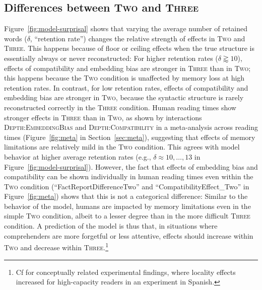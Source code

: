 \subsection{Differences between \textsc{Two} and \textsc{Three}}
Figure~\ref{fig:model-surprisal} shows that varying the average number of retained words ($\delta$, ``retention rate'') changes the relative strength of effects in \textsc{Two} and \textsc{Three}.
This happens because of floor or ceiling effects when the true structure is essentially always or never reconstructed:
For higher retention rates ($\delta \gtrapprox 10$), effects of compatibility and embedding bias are stronger in \textsc{Three} than in \textsc{Two}; this happens because the \textsc{Two} condition is unaffected by memory loss at high retention rates. 
In contrast, for low retention rates, effects of compatibility and embedding bias are stronger in \textsc{Two}, because the syntactic structure is rarely reconstructed correctly in the \textsc{Three} condition. 
Human reading times show stronger effects in \textsc{Three} than in \textsc{Two}, as shown by interactions \textsc{Depth}:\textsc{EmbeddingBias} and \textsc{Depth}:\textsc{Compatibility} in a meta-analysis across reading times (Figure~\ref{fig:meta} in Section~\ref{sec:meta}), suggesting that effects of memory limitations are relatively mild in the \textsc{Two} condition.
This agrees with model behavior at higher average retention rates (e.g., $\delta \approx 10, \dots, 13$ in Figure~\ref{fig:model-surprisal}).
However, the fact that effects of embedding bias and compatibility can be shown individually in human reading times even within the  \textsc{Two} condition  (``FactReportDifferenceTwo'' and ``CompatibilityEffect\_Two'' in Figure~\ref{fig:meta}) shows that this is not a categorical difference: Similar to the behavior of the model, humans are impacted by memory limitations even in the simple \textsc{Two} condition, albeit to a lesser degree than in the more difficult \textsc{Three} condition.
A prediction of the model is thus that, in situations where comprehenders are more forgetful or less attentive, effects should increase within \textsc{Two} and decrease within \textsc{Three}.\footnote{Cf \citet{Nicenboim2016WhenHR} for conceptually related experimental findings, where locality effects increased for high-capacity readers in an experiment in Spanish.}





